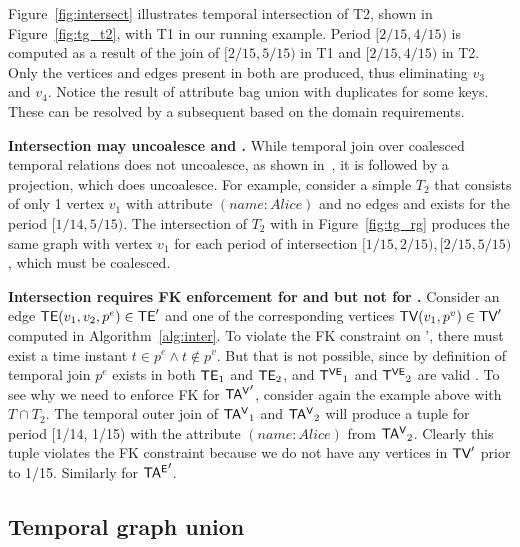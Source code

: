 Figure~\ref{fig:intersect} illustrates temporal intersection of \tg
T2, shown in Figure~\ref{fig:tg_t2}, with T1 in our running example.
Period $[2/15, 4/15)$ is computed as a result of the join of $[2/15,
    5/15)$ in T1 and [$2/15, 4/15)$ in T2.  Only the vertices and
      edges present in both \tgs are produced, thus eliminating $v_3$
      and $v_4$.  Notice the result of attribute bag union with
      duplicates for some keys.  These can be resolved by a subsequent
       based on the domain requirements.

{\bf Intersection may uncoalesce \tve and \trg.}  While temporal join over
coalesced temporal relations does not uncoalesce, as shown
in~\cite{DBLP:conf/vldb/BohlenSS96}, it is followed by a projection,
which does uncoalesce.  For example, consider a simple \tg $T_2$
that consists of only 1 vertex $v_1$ with attribute $(name:Alice)$ and
no edges and exists for the period $[1/14, 5/15)$.  The
  intersection of $T_2$ with  in Figure~\ref{fig:tg_rg}
  produces the same graph with vertex $v_1$ for each period of
  intersection $[1/15, 2/15), [2/15, 5/15)$, which must be coalesced.

{\bf Intersection requires FK enforcement for \tav and \tae but not
  for \te.}   Consider an edge $\textsf{TE}(v_1, v_2, p^e) \in \textsf{TE}'$ and
one of the corresponding vertices $\textsf{TV}(v_1, p^v) \in \textsf{TV}'$ computed in
Algorithm~\ref{alg:inter}.  To violate the FK constraint on \te',
there must exist a time instant $t \in p^e \wedge t \not\in p^v$.  But
that is not possible, since by definition of temporal join $p^e$
exists in both $\textsf{TE}_1$ and $\textsf{TE}_2$, and $\mathsf{T^{VE}}_1$ and $\mathsf{T^{VE}}_2$ are
valid \tgs.  To see why we need to enforce FK for $\mathsf{TA^{V}}'$, consider
again the example above with $T \cap T_2$.  The temporal outer join of
$\mathsf{TA^{V}}_1$ and $\mathsf{TA^{V}}_2$ will produce a tuple for period [1/14, 1/15)
  with the attribute $(name:Alice)$ from $\mathsf{TA^{V}}_2$.  Clearly this tuple
  violates the FK constraint because we do not have any vertices in
  $\textsf{TV}'$ prior to 1/15.  Similarly for $\mathsf{TA^{E}}'$.

\subsection{Temporal graph union}
\label{sec:algebra:outerjoin}

